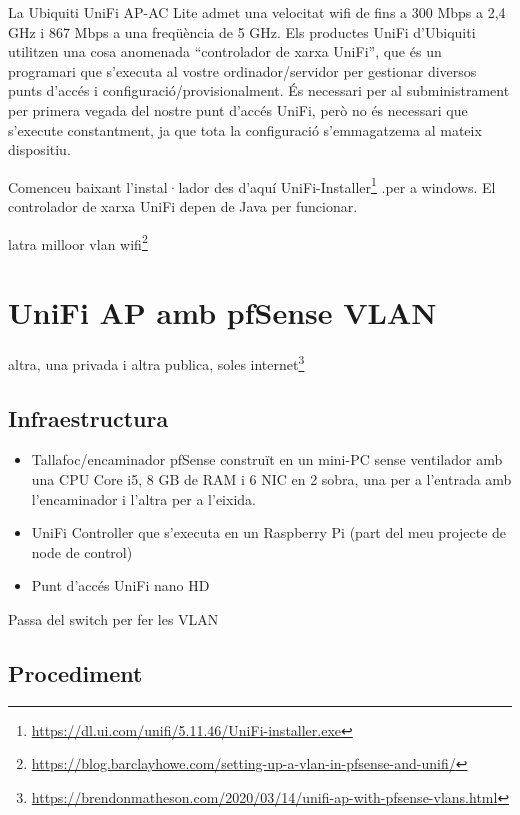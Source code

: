 \documentclass[
  10pt,
]{krantz}
\DeclareRobustCommand{\href}[2]{#2\footnote{\url{#1}}}
\providecommand{\tightlist}{%
  \setlength{\itemsep}{0pt}\setlength{\parskip}{0pt}}
\begin{document}
La Ubiquiti UniFi AP-AC Lite admet una velocitat wifi de fins a 300 Mbps a 2,4 GHz i 867 Mbps a una freqüència de 5 GHz. Els productes UniFi d'Ubiquiti utilitzen una cosa anomenada ``controlador de xarxa UniFi'', que és un programari que s'executa al vostre ordinador/servidor per gestionar diversos punts d'accés i configuració/provisionalment. És necessari per al subministrament per primera vegada del nostre punt d'accés UniFi, però no és necessari que s'execute constantment, ja que tota la configuració s'emmagatzema al mateix dispositiu.

Comenceu baixant l'instal·lador des d'aquí \href{https://dl.ui.com/unifi/5.11.46/UniFi-installer.exe}{UniFi-Installer} .per a windows. El controlador de xarxa UniFi depen de Java per funcionar.

\href{https://blog.barclayhowe.com/setting-up-a-vlan-in-pfsense-and-unifi/}{latra milloor vlan wifi}

\hypertarget{unifi-ap-amb-pfsense-vlan}{%
\section{UniFi AP amb pfSense VLAN}\label{unifi-ap-amb-pfsense-vlan}}

\href{https://brendonmatheson.com/2020/03/14/unifi-ap-with-pfsense-vlans.html}{altra, una privada i altra publica, soles internet}

\hypertarget{infraestructura-1}{%
\subsection{Infraestructura}\label{infraestructura-1}}

\begin{itemize}
\tightlist
\item
  Tallafoc/encaminador pfSense construït en un mini-PC sense ventilador amb una CPU Core i5, 8 GB de RAM i 6 NIC en 2 sobra, una per a l'entrada amb l'encaminador i l'altra per a l'eixida.
\item
  UniFi Controller que s'executa en un Raspberry Pi (part del meu projecte de node de control)
\item
  Punt d'accés UniFi nano HD
\end{itemize}

Passa del switch per fer les VLAN

\hypertarget{procediment}{%
\subsection{Procediment}\label{procediment}}
\end{document}
